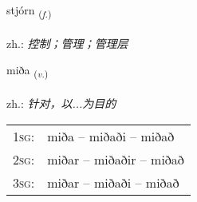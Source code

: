 \documentclass[frontgrid, backgrid]{flacards}\usepackage[]{graphicx}\usepackage[]{xcolor}
\begin{document}
\renewcommand{\flhead}{\vskip5pt \fboxsep=0pt {\small\bfseries\footnotesize Nafnorð | 名词}}
\renewcommand{\fcfoot}{\vskip5pt \fboxsep=0pt \hspace{2pt}{\small\bfseries\footnotesize 1K}}

\renewcommand{\blhead}{\vskip5pt {\small\bfseries\footnotesize Nafnorð | 名词 }}
\renewcommand{\bcfoot}{\vskip5pt \hspace{2pt}{\small\bfseries\footnotesize 1K}}


{stjórn \small{\textsubscript{(\textit{f.})}} \\[1ex] %
\textphonetic{[stjourtn̥]} \\
zh.: \emph{控制；管理；管理层} \\  [2ex]
\renewcommand*{\arraystretch}{0.8}
}

\renewcommand{\flhead}{\vskip5pt \fboxsep=0pt {\small\bfseries\footnotesize Sagnorð | 动词}}
\renewcommand{\fcfoot}{\vskip5pt \fboxsep=0pt \hspace{2pt}{\small\bfseries\footnotesize 1K}}

\renewcommand{\blhead}{\vskip5pt {\small\bfseries\footnotesize Sagnorð | 动词 }}
\renewcommand{\bcfoot}{\vskip5pt \hspace{2pt}{\small\bfseries\footnotesize 1K}}


{miða \small{\textsubscript{(\textit{v.})}} \\[1ex] %
\textphonetic{[mɪːða]} \\
zh.: \emph{针对，以...为目的} \\  [2ex]
\renewcommand*{\arraystretch}{0.8}
\begin{tabular}{p{1cm}l}
\textsc{1sg}: & miða -- miðaði -- miðað \\ 
\textsc{2sg}: & miðar -- miðaðir -- miðað \\ 
\textsc{3sg}: & miðar -- miðaði -- miðað \\ 
\end{tabular}
}
\end{document}
